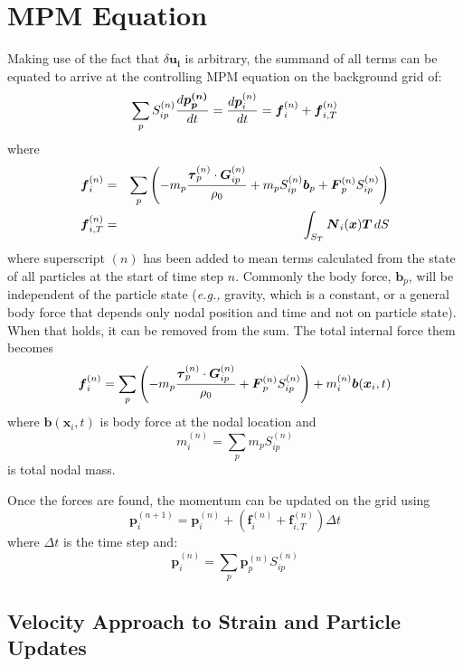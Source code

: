 \documentclass[11pt]{article}
\renewcommand{\vec}[1]{\boldsymbol{#1}}
\newcommand{\tens}[1]{\boldsymbol{\mathsf{#1}}}
\begin{document}
\section{MPM Equation}

Making use of the fact that $\delta\vec{u_i}$ is arbitrary, the summand of all terms can be equated to arrive at the controlling MPM equation on the background grid of:
\begin{equation}
    \sum_p S_{ip}^{(n)} {d\vec{ p_p^{(n)}}\over dt} = {d\vec p_i^{(n)}\over dt} = \vec f_i^{(n)} + \vec f_{i,T} ^{(n)}            \label{momEq}
\end{equation}
where
\begin{eqnarray}
	 \vec f_i^{(n)} & = & \sum_p \left(-m_p{\tens\tau_p^{(n)}\cdot \vec G_{ip}^{(n)}\over \rho_0}  + m_p S_{ip}^{(n)}  \vec b_p +  \vec F_p^{(n)}S_{ip}^{(n)}\right) \\
	 \vec f_{i,T}^{(n)} & = & \int_{S_T}\vec N_i(\vec x) \vec T \thinspace dS
\end{eqnarray}
where superscript $(n)$ has been added to mean terms calculated from the state of all particles at the start of time step $n$. Commonly the body force, $\vec b_p$, will be independent of the particle state ({\em e.g.,} gravity, which is a constant, or a general body force that depends only nodal position and time and not on particle state). When that holds, it can be removed from the sum. The total internal force them becomes
\begin{equation}
	 \vec f_i^{(n)} = \sum_p \left(-m_p{\tens\tau_p^{(n)}\cdot \vec G_{ip}^{(n)}\over \rho_0}  +  \vec F_p^{(n)}S_{ip}^{(n)}\right)  + m_i^{(n)}\vec b(\vec x_i,t) 
	 \label{fidef}
\end{equation}
where $\vec b(\vec x_i,t)$ is body force at the nodal location and
\begin{equation}
	 m_i^{(n)} = \sum_p m_p S_{ip}^{(n)} 
\end{equation}
is total nodal mass.

Once the forces are found, the momentum can be updated on the grid using
\begin{equation}
           \vec p_i^{(n+1)} = \vec p_i^{(n)} + (\vec f_i^{(n)} + \vec f_{i,T}^{(n)})\Delta t
\end{equation}
where $\Delta t$ is the time step and:
\begin{equation}
         	 \vec{p}_i^{(n)} = \sum_p \vec{p}_p^{(n)} S_{ip}^{(n)} 
\end{equation}

\subsection{Velocity Approach to Strain and Particle Updates}
\end{document}
